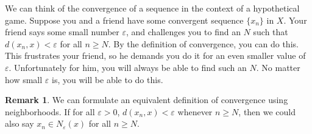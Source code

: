 \documentclass{article}
\theoremstyle{definition}
\newtheorem{remark}{Remark}[section]
\begin{document}
	We can think of the convergence of a sequence in the context of a hypothetical game. Suppose you and a friend have some convergent sequence $ \{x_n\} $ in $ X $. Your friend says some small number $ \varepsilon $, and challenges you to find an $ N $ such that $ d(x_n,x)<\varepsilon $ for all $ n\ge N $. By the definition of convergence, you can do this. This frustrates your friend, so he demands you do it for an even smaller value of $ \varepsilon $. Unfortunately for him, you will always be able to find such an $ N $. No matter how small $ \varepsilon $ is, you will be able to do this. 
	\begin{remark}
		We can formulate an equivalent definition of convergence using neighborhoods. If for all  $ \varepsilon>0 $, $ d(x_n,x)<\varepsilon $ whenever $ n\ge N $, then we could also say $ x_n\in N_\varepsilon(x) $ for all $ n\ge N $. 
	\end{remark}
	
\end{document}
